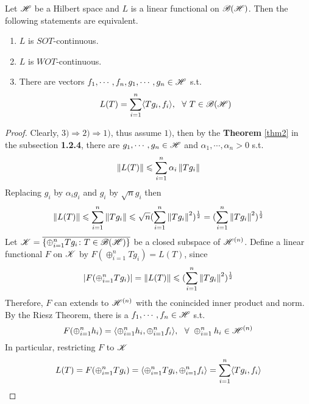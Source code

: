 \documentclass[a4paper,11pt]{report}
\begin{document}
\begin{prop} \label{prop13}
	Let $\mathscr{H}$ be a Hilbert space and $L$ is a linear functional on $\mathscr{B(H)}$. Then the following statements are equivalent.
	\begin{enumerate}[label=\arabic*)]
		\item $L$ is $SOT$-continuous.
		\item $L$ is $WOT$-continuous.
		\item There are vectors $f_1,\cdots,f_n,g_1,\cdots,g_n \in \mathscr{H}$ s.t.
		\begin{equation*}
			L(T) = \sum_{i=1}^{n} \langle Tg_i,f_i \rangle,~~\forall~T \in \mathscr{B(H)}
		\end{equation*}
	\end{enumerate}
\end{prop}
\begin{proof}
	Clearly, $3) \Rightarrow 2) \Rightarrow 1)$, thus assume $1)$, then by the \textbf{Theorem} \ref{thm2} in the subsection \textbf{1.2.4}, there are $g_1,\cdots,g_n \in \mathscr{H}$ and $\alpha_1,\cdots,\alpha_n > 0$ s.t.
	\begin{equation*}
		\left\lVert L(T)\right\lVert \leqslant \sum_{i=1}^{n} \alpha_i \left\lVert Tg_i\right\lVert
	\end{equation*}
	Replacing $g_i$ by $\alpha_i g_i$ and $g_i$ by $\sqrt{n} g_i$ then
	\begin{equation*}
		\left\lVert L(T)\right\lVert \leqslant \sum_{i=1}^{n} \left\lVert Tg_i\right\lVert \leqslant \sqrt{n}(\sum_{i=1}^{n} \left\lVert Tg_i\right\lVert^2)^{\frac{1}{2}} = (\sum_{i=1}^{n} \left\lVert Tg_i\right\lVert^2)^{\frac{1}{2}}
	\end{equation*}
	Let $\mathscr{K} = \overline{\{\oplus_{i=1}^{n}Tg_i \colon T \in \mathscr{B(H)}\}}$ be a closed subspace of $\mathscr{H}^{(n)}$. 
	Define a linear functional $F$ on $\mathscr{K}$ by $F(\oplus_{i=1}^{n}Tg_i) = L(T)$, since
	\begin{equation*}
		\left\lvert F(\oplus_{i=1}^{n}Tg_i)\right\lvert = \left\lVert L(T)\right\lVert \leqslant (\sum_{i=1}^{n} \left\lVert Tg_i\right\lVert^2)^{\frac{1}{2}}
	\end{equation*}
	Therefore, $F$ can extends to $\mathscr{H}^{(n)}$ with the conincided inner product and norm. By the Riesz Theorem, there is a $f_1, \cdots, f_n \in \mathscr{H}$ s.t.
	\begin{equation*}
		F(\oplus_{i=1}^{n}h_i) = \langle \oplus_{i=1}^{n}h_i, \oplus_{i=1}^{n}f_i \rangle,~~\forall~\oplus_{i=1}^{n}h_i \in \mathscr{H}^{(n)}
	\end{equation*}
	In particular, restricting $F$ to $\mathscr{K}$
	\begin{equation*}
		L(T) = F(\oplus_{i=1}^{n}Tg_i) = \langle \oplus_{i=1}^{n}Tg_i, \oplus_{i=1}^{n}f_i \rangle = \sum_{i=1}^{n} \langle Tg_i,f_i \rangle \qedhere
	\end{equation*}

\end{proof}
\end{document}
